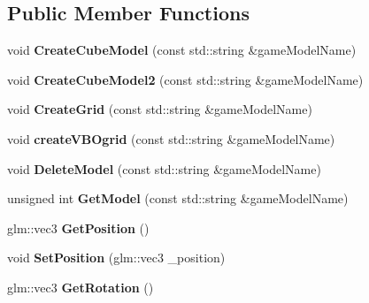 \subsection*{Public Member Functions}
\begin{DoxyCompactItemize}
\item 
\hypertarget{classModelLoader_ac14dc611ee3ec0f7a20294ea9509fb10}{
void {\bfseries CreateCubeModel} (const std::string \&gameModelName)}
\label{classModelLoader_ac14dc611ee3ec0f7a20294ea9509fb10}

\item 
\hypertarget{classModelLoader_a86c83b98085243935a6a0de0785c7512}{
void {\bfseries CreateCubeModel2} (const std::string \&gameModelName)}
\label{classModelLoader_a86c83b98085243935a6a0de0785c7512}

\item 
\hypertarget{classModelLoader_ae45b20a6326655a86b61c43a8bec2d17}{
void {\bfseries CreateGrid} (const std::string \&gameModelName)}
\label{classModelLoader_ae45b20a6326655a86b61c43a8bec2d17}

\item 
\hypertarget{classModelLoader_ae807caa16c2e2b1c87eeebb344ba7ebb}{
void {\bfseries createVBOgrid} (const std::string \&gameModelName)}
\label{classModelLoader_ae807caa16c2e2b1c87eeebb344ba7ebb}

\item 
\hypertarget{classModelLoader_aa85f00738360bfc64f31f2e11c4efc58}{
void {\bfseries DeleteModel} (const std::string \&gameModelName)}
\label{classModelLoader_aa85f00738360bfc64f31f2e11c4efc58}

\item 
\hypertarget{classModelLoader_a1e37e94c952b4157ff071146bfee927a}{
unsigned int {\bfseries GetModel} (const std::string \&gameModelName)}
\label{classModelLoader_a1e37e94c952b4157ff071146bfee927a}

\item 
\hypertarget{classModelLoader_a522ddc775b7b60f89bc36242e806cbf0}{
glm::vec3 {\bfseries GetPosition} ()}
\label{classModelLoader_a522ddc775b7b60f89bc36242e806cbf0}

\item 
\hypertarget{classModelLoader_ab57ba52335d4efd8b55d843d3801ca3c}{
void {\bfseries SetPosition} (glm::vec3 \_\-position)}
\label{classModelLoader_ab57ba52335d4efd8b55d843d3801ca3c}

\item 
\hypertarget{classModelLoader_a5bf2312dc46e142f1877739dfcc756e8}{
glm::vec3 {\bfseries GetRotation} ()}
\label{classModelLoader_a5bf2312dc46e142f1877739dfcc756e8}


\end{DoxyCompactItemize}
